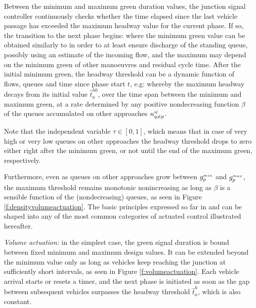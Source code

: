Between the minimum and maximum green duration values, the junction signal controller
continuously checks whether the time elapsed since the last vehicle passage has exceeded the
maximum headway value for the current phase. If so, the transition to the next phase begins:
where the minimum green value can be obtained similarly to  in order to at least ensure discharge of the standing queue, possibly using an estimate of the incoming flow, and the
maximum may depend on the minimum green of other manoeuvres and residual cycle time.
After the initial minimum green, the headway threshold can be a dynamic function of flows,
queues and time since phase start $t$, e.g:
whereby the maximum headway decays from its initial value $\hat{t}_a^{h0}$, over the time span between the minimum and maximum green, at a rate determined by any positive nondecreasing
function $\beta$ of the queues accumulated on other approaches $n_{q \neq p}^{\scriptscriptstyle{Q}}$.

Note that the independent variable $\tau \in [0,1]$, which means that in case of very high or very
low queues on other approaches the headway threshold drops to zero either right after the minimum
green, or not until the end of the maximum green, respectively.

Furthermore, even as queues on other approaches grow between $g_{p}^{\scriptscriptstyle{min}}$ and $g_{p}^{\scriptscriptstyle{max}}$, the
maximum threshold remains monotonic nonincreasing as long as $\beta$ is a sensible function of
the (nondecreasing) queues, as seen in Figure \ref{f:densityvolumeactuation}. The basic principles expressed so far in  and  can be shaped into any of the most
common categories of actuated control illustrated hereafter.

\textit{Volume actuation:} in the simplest case, the green signal duration is bound between fixed
minimum and maximum design values. It can be extended beyond the minimum value only as
long as vehicles keep reaching the junction at sufficiently short intervals, as seen in Figure \ref{f:volumeactuation}.
Each vehicle arrival starts or resets a timer, and the next phase is initiated as soon as the gap
between subsequent vehicles surpasses the headway threshold $\hat{t}_a^{h}$, which is also constant.

